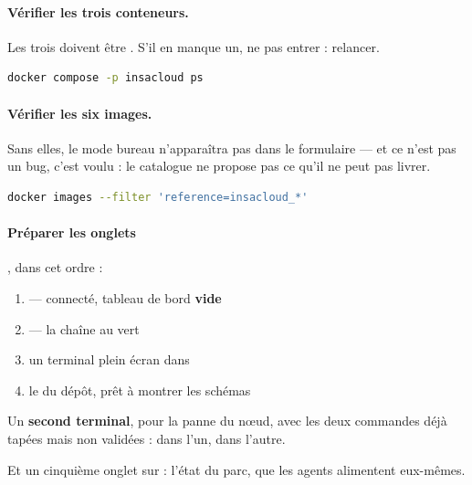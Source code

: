 \documentclass[a4paper,11pt,oneside]{report}
\begin{document}
\paragraph{Vérifier les trois conteneurs.} Les trois doivent être
. S'il en manque un, ne pas entrer : relancer.

\begin{lstlisting}[language=bash]
docker compose -p insacloud ps
\end{lstlisting}



\paragraph{Vérifier les six images.} Sans elles, le mode bureau n'apparaîtra
pas dans le formulaire --- et ce n'est pas un bug, c'est voulu : le catalogue
ne propose pas ce qu'il ne peut pas livrer.

\begin{lstlisting}[language=bash]
docker images --filter 'reference=insacloud_*'
\end{lstlisting}



\paragraph{Préparer les onglets}, dans cet ordre :

\begin{enumerate}
\item {} --- connecté, tableau de bord \textbf{vide}
\item {} --- la chaîne au vert
\item un terminal plein écran dans 
\item le  du dépôt, prêt à montrer les schémas
\end{enumerate}

Un \textbf{second terminal}, pour la panne du nœud, avec les deux commandes
déjà tapées mais non validées :  dans
l'un,  dans l'autre.

Et un cinquième onglet sur  : l'état du
parc, que les agents alimentent eux-mêmes.
\end{document}
